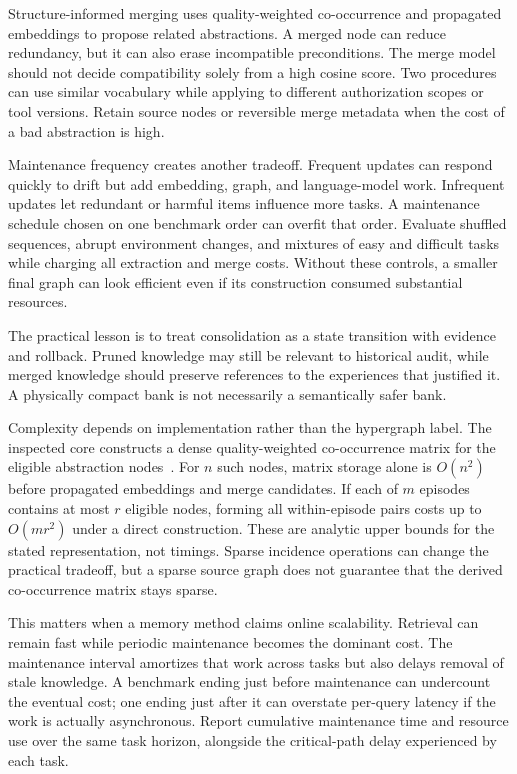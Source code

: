 Structure-informed merging uses quality-weighted co-occurrence and propagated embeddings to propose related abstractions. A merged node can reduce redundancy, but it can also erase incompatible preconditions. The merge model should not decide compatibility solely from a high cosine score. Two procedures can use similar vocabulary while applying to different authorization scopes or tool versions. Retain source nodes or reversible merge metadata when the cost of a bad abstraction is high.

Maintenance frequency creates another tradeoff. Frequent updates can respond quickly to drift but add embedding, graph, and language-model work. Infrequent updates let redundant or harmful items influence more tasks. A maintenance schedule chosen on one benchmark order can overfit that order. Evaluate shuffled sequences, abrupt environment changes, and mixtures of easy and difficult tasks while charging all extraction and merge costs. Without these controls, a smaller final graph can look efficient even if its construction consumed substantial resources.

The practical lesson is to treat consolidation as a state transition with evidence and rollback. Pruned knowledge may still be relevant to historical audit, while merged knowledge should preserve references to the experiences that justified it. A physically compact bank is not necessarily a semantically safer bank.

Complexity depends on implementation rather than the hypergraph label. The inspected core constructs a dense quality-weighted co-occurrence matrix for the eligible abstraction nodes~\cite{repo_hyperskill2026}. For $n$ such nodes, matrix storage alone is $O(n^2)$ before propagated embeddings and merge candidates. If each of $m$ episodes contains at most $r$ eligible nodes, forming all within-episode pairs costs up to $O(mr^2)$ under a direct construction. These are analytic upper bounds for the stated representation, not timings. Sparse incidence operations can change the practical tradeoff, but a sparse source graph does not guarantee that the derived co-occurrence matrix stays sparse.

This matters when a memory method claims online scalability. Retrieval can remain fast while periodic maintenance becomes the dominant cost. The maintenance interval amortizes that work across tasks but also delays removal of stale knowledge. A benchmark ending just before maintenance can undercount the eventual cost; one ending just after it can overstate per-query latency if the work is actually asynchronous. Report cumulative maintenance time and resource use over the same task horizon, alongside the critical-path delay experienced by each task.

